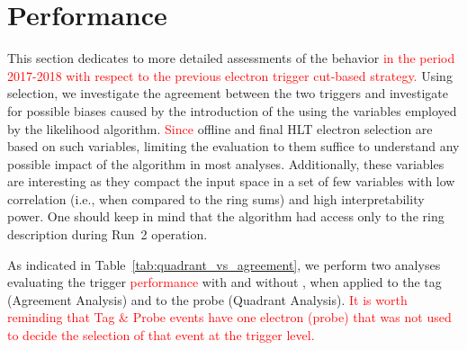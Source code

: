 
\chapter{\rnn{} Performance}%
\label{sec:off_ana}

This section dedicates to more detailed assessments of the \rnn{} behavior 
\textcolor{red}{in the period 2017-2018 with respect to the previous electron trigger cut-based strategy.}
Using \Zee{} \tnp{}
selection, we investigate the agreement between the two triggers and investigate
for possible biases caused by the introduction of the \rnn{} using the variables
employed by the likelihood algorithm. \textcolor{red}{Since} offline and final HLT electron
selection are based on such variables, limiting the evaluation to them suffice
to understand any possible impact of the \rnn{} algorithm in most analyses.
Additionally, these variables are interesting \textcolor{ref}{as} they compact the input space
in a set of few variables with low correlation (i.e., when compared to the ring
sums) and high interpretability power. One should keep in mind that the \rnn{}
algorithm had access only to the ring description during Run~2 operation.

As indicated in
Table~\ref{tab:quadrant_vs_agreement}, we perform two analyses evaluating the
trigger \textcolor{red}{performance} with and without \rnn{}, when applied to the tag (Agreement Analysis) and
to the probe (Quadrant Analysis).
\textcolor{red}{ It is worth reminding that Tag \& Probe events have one electron (probe) that was not used to decide the selection of that event at the trigger level.
}

\begin{table}[ht!]\footnotesize
\centering
\caption{Customized \Zee{} \tap{} selection criteria employed in the
agreement and quadrant analyses \textcolor{red}{in the Run 2 (2017-2018 period)}.}%
\label{tab:quadrant_vs_agreement}
\end{table}

